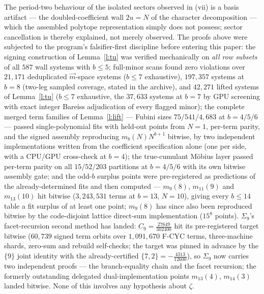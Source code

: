 \documentclass[11pt]{article}
\numberwithin{equation}{section}
\theoremstyle{definition}
\theoremstyle{remark}
\begin{document}
The period-two behaviour of the isolated sectors observed in
(vii) is a basis artifact --- the doubled-coefficient wall
$2u=N$ of the character decomposition --- which the
assembled polytope representation simply does not possess;
sector cancellation is thereby explained, not merely
observed. The proofs above were subjected to the program's
falsifier-first discipline before entering this paper:
the signing construction of Lemma~\ref{l:tu} was verified
mechanically on \emph{all row subsets} of all $587$ wall
systems with $b\le5$; full-minor scans found zero violations
over $21{,}171$ deduplicated $\vec m$-space systems
($b\le7$ exhaustive), $197{,}357$ systems at $b=8$
(two-leg sampled coverage, stated in the archive), and
$42{,}271$ lifted systems of Lemma~\ref{l:tu} ($b\le7$
exhaustive, the $37{,}633$ systems at $b=7$ by GPU screening
with exact integer Bareiss adjudication of every flagged
minor); the complete merged term families of
Lemma~\ref{l:lift} --- Fubini sizes $75/541/4{,}683$ at
$b=4/5/6$ --- passed single-polynomial fits with held-out
points from $N{=}1$, per-term parity, and the signed
assembly reproducing $m_b(N)N^{b+1}$ bitwise, by two
independent implementations written from the coefficient
specification alone (one per side, with a CPU/GPU
cross-check at $b=4$); the
true-cumulant M\"obius layer passed per-term parity on all
$15/52/203$ partitions at $b=4/5/6$ with its own bitwise
assembly gate; and the odd-$b$
surplus points were pre-registered as predictions of the
already-determined fits and then computed --- $m_9(8)$,
$m_{11}(9)$ and
$m_{13}(10)$ hit bitwise ($3{,}243{,}531$ terms at
$b{=}13$, $N{=}10$), giving every $b\le14$ table a fit
surplus of at least one point; $m_9(8)$ has since also been
reproduced bitwise by the code-disjoint lattice direct-sum
implementation ($15^8$ points). $\Sigma_9$'s facet-recursion second
method has landed: $C_9=\tfrac{27649}{302400}$ hit its
pre-registered target bitwise ($60{,}739$ signed term
orbits over $1{,}091{,}670$ F-CYC terms, three-machine
shards, zero-sum and rebuild self-checks; the target was
pinned in advance by the $\{9\}$ joint identity with the
already-certified $\{7,2\}=-\tfrac{4313}{12600}$), so
$\Sigma_9$ now carries two independent proofs --- the
branch-equality chain and the facet recursion; the formerly
outstanding delegated dual-implementation points
$m_{13}(4)$, $m_{14}(3)$ landed bitwise. None of this
involves any hypothesis about $\zeta$.
\end{document}

